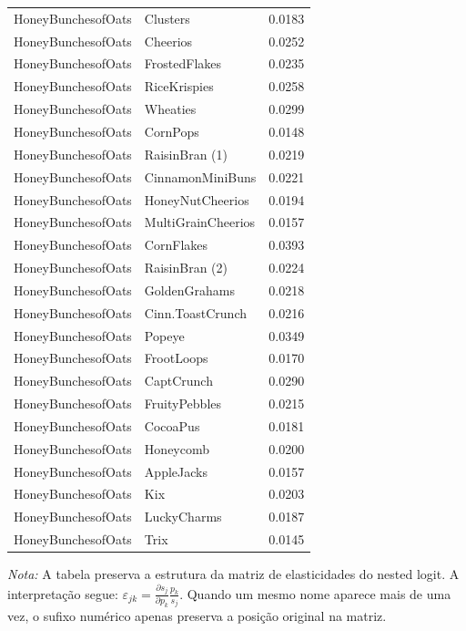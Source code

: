 \begin{table}[H]
\begin{tabular}{llr}
HoneyBunchesofOats & Clusters & 0.0183 \\
HoneyBunchesofOats & Cheerios & 0.0252 \\
HoneyBunchesofOats & FrostedFlakes & 0.0235 \\
HoneyBunchesofOats & RiceKrispies & 0.0258 \\
HoneyBunchesofOats & Wheaties & 0.0299 \\
HoneyBunchesofOats & CornPops & 0.0148 \\
HoneyBunchesofOats & RaisinBran (1) & 0.0219 \\
HoneyBunchesofOats & CinnamonMiniBuns & 0.0221 \\
HoneyBunchesofOats & HoneyNutCheerios & 0.0194 \\
HoneyBunchesofOats & MultiGrainCheerios & 0.0157 \\
HoneyBunchesofOats & CornFlakes & 0.0393 \\
HoneyBunchesofOats & RaisinBran (2) & 0.0224 \\
HoneyBunchesofOats & GoldenGrahams & 0.0218 \\
HoneyBunchesofOats & Cinn.ToastCrunch & 0.0216 \\
HoneyBunchesofOats & Popeye & 0.0349 \\
HoneyBunchesofOats & FrootLoops & 0.0170 \\
HoneyBunchesofOats & CaptCrunch & 0.0290 \\
HoneyBunchesofOats & FruityPebbles & 0.0215 \\
HoneyBunchesofOats & CocoaPus & 0.0181 \\
HoneyBunchesofOats & Honeycomb & 0.0200 \\
HoneyBunchesofOats & AppleJacks & 0.0157 \\
HoneyBunchesofOats & Kix & 0.0203 \\
HoneyBunchesofOats & LuckyCharms & 0.0187 \\
HoneyBunchesofOats & Trix & 0.0145 \\
\bottomrule
\end{tabular}

\vspace{0.3em}
\footnotesize
\textit{Nota:} A tabela preserva a estrutura da matriz de elasticidades do nested logit. A interpretação segue: $\varepsilon_{jk}=\frac{\partial s_j}{\partial p_k}\frac{p_k}{s_j}$. Quando um mesmo nome aparece mais de uma vez, o sufixo numérico apenas preserva a posição original na matriz.
\end{table}
\endgroup

